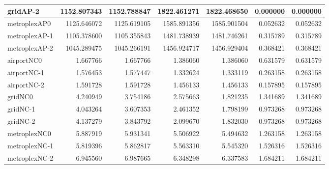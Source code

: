 \begin{longtable}{|l|r|r|r|r|r|r|}
gridAP-2 & 1152.807343 & 1152.788847 & 1822.461271 & 1822.468650 & 0.000000 & 0.000000 \\ \hline
metroplexAP0 & 1125.646072 & 1125.619105 & 1585.891356 & 1585.901504 & 0.052632 & 0.052632 \\ \hline
metroplexAP-1 & 1105.378600 & 1105.355843 & 1481.738939 & 1481.746261 & 0.315789 & 0.315789 \\ \hline
metroplexAP-2 & 1045.289475 & 1045.266191 & 1456.924717 & 1456.929404 & 0.368421 & 0.368421 \\ \hline
airportNC0 & 1.667766 & 1.667766 & 1.386060 & 1.386060 & 0.631579 & 0.631579 \\ \hline
airportNC-1 & 1.576453 & 1.577447 & 1.332624 & 1.333119 & 0.263158 & 0.263158 \\ \hline
airportNC-2 & 1.591728 & 1.591728 & 1.456133 & 1.456133 & 0.157895 & 0.157895 \\ \hline
gridNC0 & 4.240949 & 3.754186 & 2.575663 & 1.821235 & 1.341689 & 1.341689 \\ \hline
gridNC-1 & 4.043264 & 3.607353 & 2.461352 & 1.798199 & 0.973268 & 0.973268 \\ \hline
gridNC-2 & 4.137279 & 3.843792 & 2.099670 & 1.832030 & 0.973268 & 0.973268 \\ \hline
metroplexNC0 & 5.887919 & 5.931341 & 5.506922 & 5.494632 & 1.263158 & 1.263158 \\ \hline
metroplexNC-1 & 5.819396 & 5.862817 & 5.563310 & 5.545320 & 1.526316 & 1.526316 \\ \hline
metroplexNC-2 & 6.945560 & 6.987665 & 6.348298 & 6.337583 & 1.684211 & 1.684211 \\ \hline
\end{longtable}
